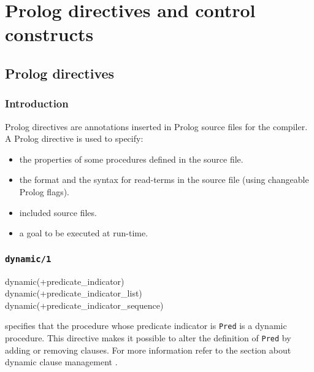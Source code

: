 \newpage
\section{Prolog directives and control constructs}
\subsection{Prolog directives}

\subsubsection{Introduction}
Prolog directives are annotations inserted in Prolog source files for the
compiler. A Prolog directive is used to specify:

\begin{itemize}

\item the properties of some procedures defined in the source file.

\item the format and the syntax for read-terms in the source file (using
changeable Prolog flags).

\item included source files.

\item a goal to be executed at run-time.

\end{itemize}

\subsubsection{\texttt{dynamic/1}}
\label{dynamic/1}

\begin{TemplatesOneCol}
dynamic(+predicate\_indicator)\\
dynamic(+predicate\_indicator\_list)\\
dynamic(+predicate\_indicator\_sequence)

\end{TemplatesOneCol}

\Description

 specifies that the procedure whose
predicate indicator is \texttt{Pred} is a dynamic procedure. This directive
makes it possible to alter the definition of \texttt{Pred} by adding or
removing clauses. For more information refer to the section about dynamic
clause management .

